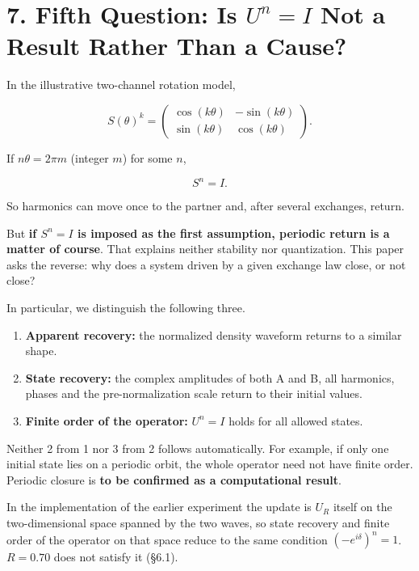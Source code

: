 \documentclass[
  a4paper,
]{article}
\providecommand{\tightlist}{%
  \setlength{\itemsep}{0pt}\setlength{\parskip}{0pt}}
\begin{document}
\section{\texorpdfstring{7. Fifth Question: Is \(U^n=I\) Not a Result
Rather Than a
Cause?}{7. Fifth Question: Is U\^{}n=I Not a Result Rather Than a Cause?}}\label{fifth-question-is-uni-not-a-result-rather-than-a-cause}

In the illustrative two-channel rotation model,

\[
S(\theta)^k=
\begin{pmatrix}
\cos(k\theta)&-\sin(k\theta)\\
\sin(k\theta)&\cos(k\theta)
\end{pmatrix}.
\]

If \(n\theta=2\pi m\) (integer \(m\)) for some \(n\),

\[
S^n=I.
\]

So harmonics can move once to the partner and, after several exchanges,
return.

But \textbf{if \(S^n=I\) is imposed as the first assumption, periodic
return is a matter of course}. That explains neither stability nor
quantization. This paper asks the reverse: why does a system driven by a
given exchange law close, or not close?

In particular, we distinguish the following three.

\begin{enumerate}
\def\labelenumi{\arabic{enumi}.}
\tightlist
\item
  \textbf{Apparent recovery:} the normalized density waveform returns to
  a similar shape.
\item
  \textbf{State recovery:} the complex amplitudes of both A and B, all
  harmonics, phases and the pre-normalization scale return to their
  initial values.
\item
  \textbf{Finite order of the operator:} \(U^n=I\) holds for all allowed
  states.
\end{enumerate}

Neither 2 from 1 nor 3 from 2 follows automatically. For example, if
only one initial state lies on a periodic orbit, the whole operator need
not have finite order. Periodic closure is \textbf{to be confirmed as a
computational result}.

In the implementation of the earlier experiment the update is \(U_R\)
itself on the two-dimensional space spanned by the two waves, so state
recovery and finite order of the operator on that space reduce to the
same condition \((-e^{i\delta})^n=1\). \(R=0.70\) does not satisfy it
(§6.1).
\end{document}
